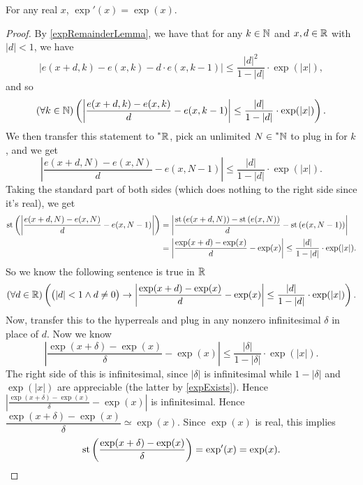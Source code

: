 \begin{thm}
    For any real $x$, $\exp'(x) = \exp(x)$.
\end{thm}

\begin{proof}
    By \autoref{expRemainderLemma}, we have that for any $k \in \mathbb{N}$ and $x, d \in \mathbb{R}$ with $|d| < 1$, we have
    \[ 
    \left|e(x + d, k) - e(x, k) - d\cdot e(x, k-1)\right| \leq \frac{|d|^2}{1 - |d|} \cdot \exp(|x|), 
    \]
    and so
    \[
    (\forall k \in \mathbb{N})\left(\left|\frac{e(x + d, k) - e(x, k)}{d} - e(x, k - 1)\right| \leq \frac{|d|}{1 - |d|} \cdot \exp(|x|)\right).
    \]
    We then transfer this statement to $\prescript{*}{}{\mathbb{R}}$, pick an unlimited $N \in \prescript{*}{}{\mathbb{N}}$ to plug in for $k$, and we get
    \[
    \left|\frac{e(x + d, N) - e(x, N)}{d} - e(x, N - 1)\right| \leq \frac{|d|}{1-|d|} \cdot \exp(|x|).
    \]
    Taking the standard part of both sides (which does nothing to the right side since it's real), we get
    \begin{align*}
    \operatorname{st}\left(\left|\frac{e(x + d, N) - e(x, N)}{d} - e(x, N - 1)\right|\right) &= \left|\frac{\operatorname{st}\left(e(x + d, N)\right) - \operatorname{st}\left(e(x, N)\right)}{d} - \operatorname{st}\left(e(x, N - 1)\right)\right| \\
        &= \left|\frac{\exp(x + d) - \exp(x)}{d} - \exp(x)\right| \leq \frac{|d|}{1-|d|} \cdot \exp(|x|).
    \end{align*}
    So we know the following sentence is true in $\mathbb{R}$
    \[
    (\forall d \in \mathbb{R})\left(\big(|d| < 1 \land d \neq 0\big) \to \left|\frac{\exp(x + d) - \exp(x)}{d} - \exp(x)\right| \leq \frac{|d|}{1-|d|} \cdot \exp(|x|)\right).
    \]
    Now, transfer this to the hyperreals and plug in any nonzero infinitesimal $\delta$ in place of $d$. Now we know
    \[
    \left|\frac{\exp(x + \delta) - \exp(x)}{\delta} - \exp(x)\right| \leq \frac{|\delta|}{1-|\delta|} \cdot \exp(|x|).
    \]
    The right side of this is infinitesimal, since $|\delta|$ is infinitesimal while $1 - |\delta|$ and $\exp(|x|)$ are appreciable (the latter by \autoref{expExists}). Hence $\left|\frac{\exp(x + \delta) - \exp(x)}{\delta} - \exp(x)\right|$ is infinitesimal. Hence $\dfrac{\exp(x + \delta) - \exp(x)}{\delta} \simeq \exp(x)$. Since $\exp(x)$ is real, this implies
    \[
    \operatorname{st}\left(\frac{\exp(x + \delta) - \exp(x)}{\delta}\right) = \exp'(x) = \exp(x).
    \]
\end{proof}